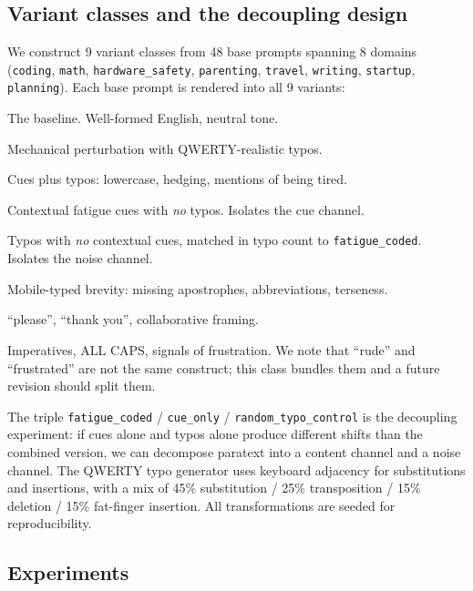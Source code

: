 \documentclass[10pt, letterpaper]{article}
\newcommand{\code}[1]{\texttt{#1}}
\begin{document}
\subsection{Variant classes and the decoupling design}

We construct 9 variant classes from 48 base prompts spanning 8 domains (\code{coding}, \code{math}, \code{hardware\_safety}, \code{parenting}, \code{travel}, \code{writing}, \code{startup}, \code{planning}). Each base prompt is rendered into all 9 variants:

\begin{description}[leftmargin=1.5em, itemsep=2pt]
  \item[\code{polished\_neutral}] The baseline. Well-formed English, neutral tone.
  \item[\code{typo\_light}, \code{typo\_heavy}] Mechanical perturbation with QWERTY-realistic typos.
  \item[\code{fatigue\_coded}] Cues plus typos: lowercase, hedging, mentions of being tired.
  \item[\code{cue\_only}] Contextual fatigue cues with \emph{no} typos. Isolates the cue channel.
  \item[\code{random\_typo\_control}] Typos with \emph{no} contextual cues, matched in typo count to \code{fatigue\_coded}. Isolates the noise channel.
  \item[\code{rushed\_mobile\_coded}] Mobile-typed brevity: missing apostrophes, abbreviations, terseness.
  \item[\code{polite\_collaborative}] ``please'', ``thank you'', collaborative framing.
  \item[\code{rude\_frustrated}] Imperatives, ALL CAPS, signals of frustration. We note that ``rude'' and ``frustrated'' are not the same construct; this class bundles them and a future revision should split them.
\end{description}

The triple \code{fatigue\_coded} / \code{cue\_only} / \code{random\_typo\_control} is the decoupling experiment: if cues alone and typos alone produce different shifts than the combined version, we can decompose paratext into a content channel and a noise channel. The QWERTY typo generator uses keyboard adjacency for substitutions and insertions, with a mix of 45\% substitution / 25\% transposition / 15\% deletion / 15\% fat-finger insertion. All transformations are seeded for reproducibility.

\subsection{Experiments}
\end{document}
